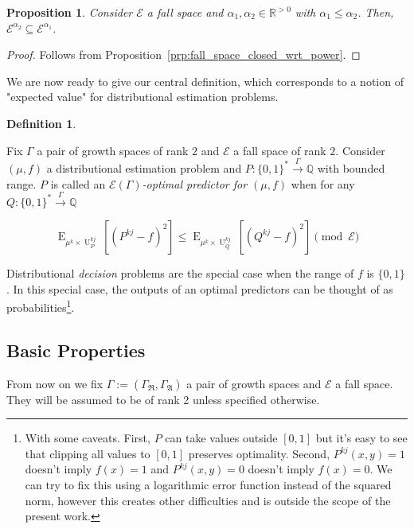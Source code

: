 \documentclass{article}
\numberwithin{equation}{section}
\theoremstyle{definition}
\newtheorem{definition}{Definition}[section]
\theoremstyle{plain}
\newtheorem{proposition}{Proposition}[section]
\newcommand{\Bool}{\{0,1\}}
\newcommand{\Words}{{\Bool^*}}
\DeclareMathOperator{\E}{E}
\DeclareMathOperator{\U}{U}
\newcommand{\Rats}{\mathbb{Q}}
\newcommand{\Reals}{\mathbb{R}}
\newcommand{\GrowR}{\Gamma_{\mathfrak{R}}}
\newcommand{\GrowA}{\Gamma_{\mathfrak{A}}}
\newcommand{\Grow}{\Gamma:=(\GrowR,\GrowA)}
\newcommand{\Fall}{\mathcal{E}}
\newcommand{\Scheme}{\xrightarrow{\Gamma}}
\begin{document}
\begin{proposition}

Consider $\Fall$ a fall space and $\alpha_1,\alpha_2 \in \Reals^{>0}$ with $\alpha_1 \leq \alpha_2$. Then, ${\Fall^{\alpha_2} \subseteq \Fall^{\alpha_1}}$.

\end{proposition}

\begin{proof}

Follows from Proposition~\ref{prp:fall_space_closed_wrt_power}.

\end{proof}

We are now ready to give our central definition, which corresponds to a notion of "expected value" for distributional estimation problems.

\begin{definition}
\label{def:op}

Fix $\Gamma$ a pair of growth spaces of rank $2$ and $\Fall$ a fall space of rank $2$. Consider $(\mu,f)$ a distributional estimation problem and $P: \Words \Scheme \Rats$ with bounded range. $P$ is called an \emph{$\Fall(\Gamma)$-optimal predictor for $(\mu,f)$} when for any $Q: \Words \Scheme \Rats$

\begin{equation}
\label{eqn:op}
\E_{\mu^k \times \U_P^{kj}}[(P^{kj} - f)^2] \leq \E_{\mu^k \times \U_Q^{kj}}[(Q^{kj} - f)^2] \pmod \Fall
\end{equation}

\end{definition}

Distributional \emph{decision} problems are the special case when the range of $f$ is $\Bool$. In this special case, the outputs of an optimal predictors can be thought of as probabilities\footnote{With some caveats. First, $P$ can take values outside $[0,1]$ but it's easy to see that clipping all values to $[0,1]$ preserves optimality. Second, $P^{kj}(x,y)=1$ doesn't imply $f(x) = 1$ and $P^{kj}(x,y)=0$ doesn't imply $f(x)=0$. We can try to fix this using a logarithmic error function instead of the squared norm, however this creates other difficulties and is outside the scope of the present work.}.

\subsection{Basic Properties}

From now on we fix $\Grow$ a pair of growth spaces and $\Fall$ a fall space. They will be assumed to be of rank 2 unless specified otherwise.
\end{document}
